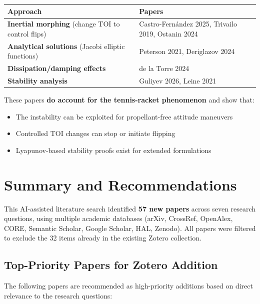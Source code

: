 \documentclass[11pt]{article}
\begin{document}
\begin{center}
\begin{tabular}{@{}ll@{}}
\toprule
Approach & Papers \\
\midrule
\textbf{Inertial morphing} (change TOI to control flips) & Castro-Fern\'{a}ndez 2025, Trivailo 2019, Ostanin 2024 \\
\textbf{Analytical solutions} (Jacobi elliptic functions) & Peterson 2021, Deriglazov 2024 \\
\textbf{Dissipation/damping effects} & de la Torre 2024 \\
\textbf{Stability analysis} & Guliyev 2026, Leine 2021 \\
\bottomrule
\end{tabular}
\end{center}

These papers \textbf{do account for the tennis-racket phenomenon} and show that:
\begin{itemize}
    \item The instability can be exploited for propellant-free attitude maneuvers
    \item Controlled TOI changes can stop or initiate flipping
    \item Lyapunov-based stability proofs exist for extended formulations
\end{itemize}

\section{Summary and Recommendations}
\label{sec:summary}

This AI-assisted literature search identified \textbf{57 new papers} across seven research questions, using multiple academic databases (arXiv, CrossRef, OpenAlex, CORE, Semantic Scholar, Google Scholar, HAL, Zenodo). All papers were filtered to exclude the 32 items already in the existing Zotero collection.

\subsection{Top-Priority Papers for Zotero Addition}

The following papers are recommended as high-priority additions based on direct relevance to the research questions:
\end{document}
